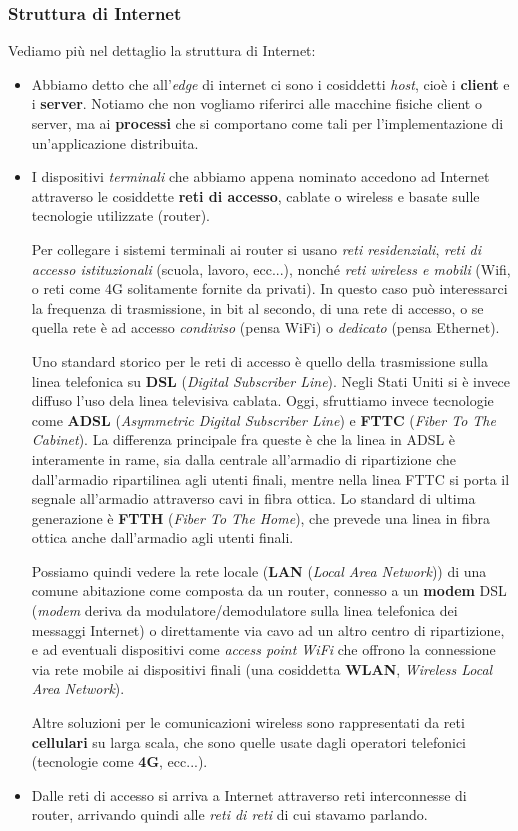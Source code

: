 \documentclass[a4paper,11pt]{article}
\begin{document}
\subsubsection{Struttura di Internet}
Vediamo più nel dettaglio la struttura di Internet:
\begin{itemize}
	\item 
	Abbiamo detto che all'\textit{edge} di internet ci sono i cosiddetti \textit{host}, cioè i \textbf{client} e i \textbf{server}. Notiamo che non vogliamo riferirci alle macchine fisiche client o server, ma ai \textbf{processi} che si comportano come tali per l'implementazione di un'applicazione distribuita.
	\item
	I dispositivi \textit{terminali} che abbiamo appena nominato accedono ad Internet attraverso le cosiddette \textbf{reti di accesso}, cablate o wireless e basate sulle tecnologie utilizzate (router).

	Per collegare i sistemi terminali ai router si usano \textit{reti residenziali}, \textit{reti di accesso istituzionali} (scuola, lavoro, ecc...), nonché \textit{reti wireless e mobili} (Wifi, o reti come 4G solitamente fornite da privati).
	In questo caso può interessarci la frequenza di trasmissione, in bit al secondo, di una rete di accesso, o se quella rete è ad accesso \textit{condiviso} (pensa WiFi) o \textit{dedicato} (pensa Ethernet).

	Uno standard storico per le reti di accesso è quello della trasmissione sulla linea telefonica su \textbf{DSL} (\textit{Digital Subscriber Line}).
	Negli Stati Uniti si è invece diffuso l'uso dela linea televisiva cablata.
	Oggi, sfruttiamo invece tecnologie come \textbf{ADSL} (\textit{Asymmetric Digital Subscriber Line}) e \textbf{FTTC} (\textit{Fiber To The Cabinet}).
	La differenza principale fra queste è che la linea in ADSL è interamente in rame, sia dalla centrale all'armadio di ripartizione che dall'armadio ripartilinea agli utenti finali, mentre nella linea FTTC si porta il segnale all'armadio attraverso cavi in fibra ottica.
	Lo standard di ultima generazione è \textbf{FTTH} (\textit{Fiber To The Home}), che prevede una linea in fibra ottica anche dall'armadio agli utenti finali.

	Possiamo quindi vedere la rete locale (\textbf{LAN} (\textit{Local Area Network})) di una comune abitazione come composta da un router, connesso a un \textbf{modem} DSL (\textit{modem} deriva da modulatore/demodulatore sulla linea telefonica dei messaggi Internet) o direttamente via cavo ad un altro centro di ripartizione, e ad eventuali dispositivi come \textit{access point WiFi} che offrono la connessione via rete mobile ai dispositivi finali (una cosiddetta \textbf{WLAN}, \textit{Wireless Local Area Network}).

	Altre soluzioni per le comunicazioni wireless sono rappresentati da reti \textbf{cellulari} su larga scala, che sono quelle usate dagli operatori telefonici (tecnologie come \textbf{4G}, ecc...).

	\item 
	Dalle reti di accesso si arriva a Internet attraverso reti interconnesse di router, arrivando quindi alle \textit{reti di reti} di cui stavamo parlando.
\end{itemize}
\end{document}
